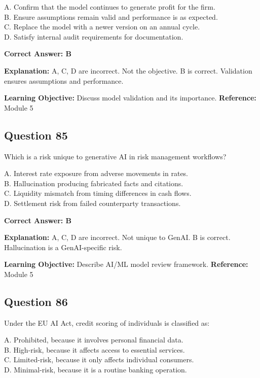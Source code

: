 \documentclass[11pt]{article}
\begin{document}
	A. Confirm that the model continues to generate profit for the firm.\\
	B. Ensure assumptions remain valid and performance is as expected.\\
	C. Replace the model with a newer version on an annual cycle.\\
	D. Satisfy internal audit requirements for documentation.
	
	\vspace{0.4em}
	\textbf{Correct Answer: B}
	
	\textbf{Explanation:}
	A, C, D are incorrect. Not the objective.
	B is correct. Validation ensures assumptions and performance.
	
	\textbf{Learning Objective:} Discuss model validation and its importance.
	\textbf{Reference:} Module 5
	
	\subsection*{Question 85}
	Which is a risk unique to generative AI in risk management workflows?
	
	A. Interest rate exposure from adverse movements in rates.\\
	B. Hallucination producing fabricated facts and citations.\\
	C. Liquidity mismatch from timing differences in cash flows.\\
	D. Settlement risk from failed counterparty transactions.
	
	\vspace{0.4em}
	\textbf{Correct Answer: B}
	
	\textbf{Explanation:}
	A, C, D are incorrect. Not unique to GenAI.
	B is correct. Hallucination is a GenAI-specific risk.
	
	\textbf{Learning Objective:} Describe AI/ML model review framework.
	\textbf{Reference:} Module 5
	
	\subsection*{Question 86}
	Under the EU AI Act, credit scoring of individuals is classified as:
	
	A. Prohibited, because it involves personal financial data.\\
	B. High-risk, because it affects access to essential services.\\
	C. Limited-risk, because it only affects individual consumers.\\
	D. Minimal-risk, because it is a routine banking operation.
	
\end{document}
